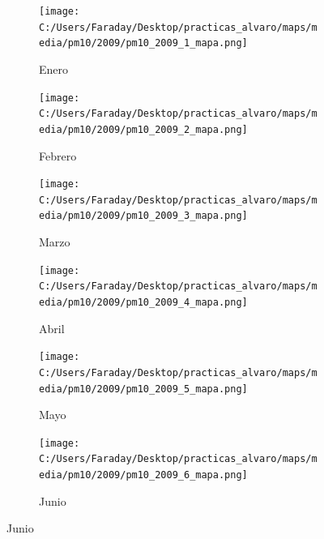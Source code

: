 \documentclass[12pt]{article}
\begin{document}
\begin{figure}[H]
\centering
\begin{subfigure}[H]{0.15\textwidth}
\texttt{[image: C:/Users/Faraday/Desktop/practicas\_alvaro/maps/media/pm10/2009/pm10\_2009\_1\_mapa.png]}
\captionsetup{labelformat=empty}
\caption{Enero}
\label{fig:map-pm10-2009-1}
\end{subfigure}
%
\begin{subfigure}[H]{0.15\textwidth}
\texttt{[image: C:/Users/Faraday/Desktop/practicas\_alvaro/maps/media/pm10/2009/pm10\_2009\_2\_mapa.png]}
\captionsetup{labelformat=empty}
\caption{Febrero}
\label{fig:map-pm10-2009-2}
\end{subfigure}
%
\begin{subfigure}[H]{0.15\textwidth}
\texttt{[image: C:/Users/Faraday/Desktop/practicas\_alvaro/maps/media/pm10/2009/pm10\_2009\_3\_mapa.png]}
\captionsetup{labelformat=empty}
\caption{Marzo}
\label{fig:map-pm10-2009-3}
\end{subfigure}
%
\begin{subfigure}[H]{0.15\textwidth}
\texttt{[image: C:/Users/Faraday/Desktop/practicas\_alvaro/maps/media/pm10/2009/pm10\_2009\_4\_mapa.png]}
\captionsetup{labelformat=empty}
\caption{Abril}
\label{fig:map-pm10-2009-4}
\end{subfigure}
%
\begin{subfigure}[H]{0.15\textwidth}
\texttt{[image: C:/Users/Faraday/Desktop/practicas\_alvaro/maps/media/pm10/2009/pm10\_2009\_5\_mapa.png]}
\captionsetup{labelformat=empty}
\caption{Mayo}
\label{fig:map-pm10-2009-5}
\end{subfigure}
%
\begin{subfigure}[H]{0.15\textwidth}
\texttt{[image: C:/Users/Faraday/Desktop/practicas\_alvaro/maps/media/pm10/2009/pm10\_2009\_6\_mapa.png]}
\captionsetup{labelformat=empty}
\caption{Junio}
\label{fig:map-pm10-2009-6}
\end{subfigure}


\end{figure}
\end{document}
